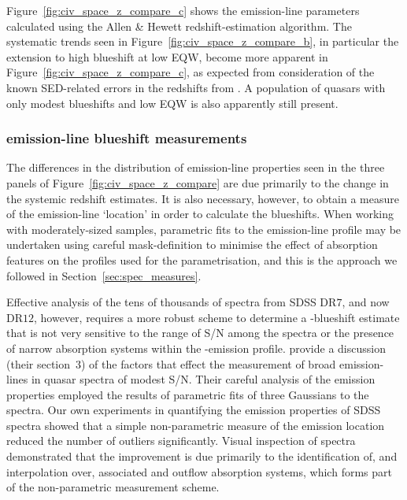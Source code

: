 Figure~\ref{fig:civ_space_z_compare_c} shows the  emission-line parameters calculated using the Allen \& Hewett redshift-estimation algorithm.  
The systematic trends seen in Figure~\ref{fig:civ_space_z_compare_b}, in particular the extension to high blueshift at low  EQW, become more apparent in Figure~\ref{fig:civ_space_z_compare_c}, as expected from consideration of the known SED-related errors in the redshifts from \citet{hewett10}.
A population of quasars with only modest blueshifts and low EQW is also apparently still present. 

\subsubsection{ emission-line blueshift measurements}
\label{sec:ch3-civmeasure}

The differences in the distribution of  emission-line properties seen in the three panels of Figure~\ref{fig:civ_space_z_compare} are due primarily to the change in the systemic redshift estimates. 
It is also necessary, however, to obtain a measure of the  emission-line `location' in order to calculate the blueshifts. 
When working with moderately-sized samples, parametric fits to the emission-line profile may be undertaken using careful mask-definition to minimise the effect of absorption features on the profiles used for the parametrisation, and this is the approach we followed in Section~\ref{sec:spec_measures}.

Effective analysis of the tens of thousands of spectra from SDSS DR$7$, and now DR$12$, however, requires a more robust scheme to determine a -blueshift estimate that is not very sensitive to the range of S/N among the spectra or the presence of narrow absorption systems within the -emission profile. 
\citet{shen11} provide a discussion (their section~3) of the factors that effect the measurement of broad emission-lines in quasar spectra of modest S/N. 
Their careful analysis of the  emission properties employed the results of parametric fits of three Gaussians to the spectra. 
Our own experiments in quantifying the  emission properties of SDSS spectra showed that a simple non-parametric measure of the  emission location reduced the number of outliers significantly. 
Visual inspection of spectra demonstrated that the improvement is due primarily to the identification of, and interpolation over, associated and outflow absorption systems, which forms part of the non-parametric measurement scheme. 

